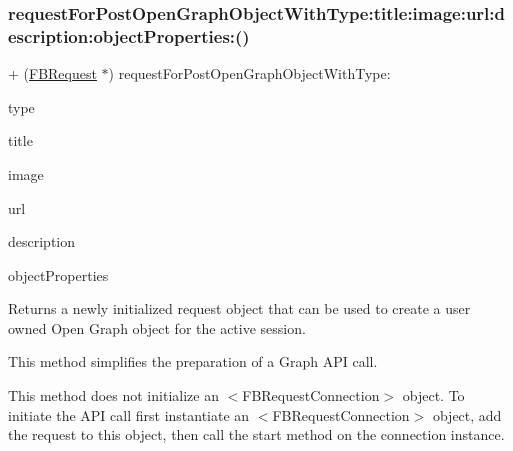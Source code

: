 \subsubsection{\texorpdfstring{request\+For\+Post\+Open\+Graph\+Object\+With\+Type\+:title\+:image\+:url\+:description\+:object\+Properties\+:()}{requestForPostOpenGraphObjectWithType:title:image:url:description:objectProperties:()}\hspace{0.1cm}{\footnotesize\ttfamily [1/5]}}
{\footnotesize\ttfamily + (\hyperlink{interfaceFBRequest}{F\+B\+Request} $\ast$) request\+For\+Post\+Open\+Graph\+Object\+With\+Type\+: \begin{DoxyParamCaption}\item[{(N\+S\+String $\ast$)}]{type }\item[{title:(N\+S\+String $\ast$)}]{title }\item[{image:(id)}]{image }\item[{url:(id)}]{url }\item[{description:(N\+S\+String $\ast$)}]{description }\item[{objectProperties:(N\+S\+Dictionary $\ast$)}]{object\+Properties }\end{DoxyParamCaption}}

Returns a newly initialized request object that can be used to create a user owned Open Graph object for the active session.

This method simplifies the preparation of a Graph A\+PI call.

This method does not initialize an $<$\+F\+B\+Request\+Connection$>$ object. To initiate the A\+PI call first instantiate an $<$\+F\+B\+Request\+Connection$>$ object, add the request to this object, then call the {\ttfamily start} method on the connection instance.



